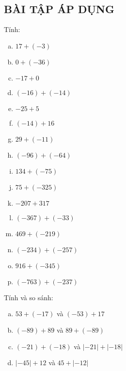\subsection{BÀI TẬP ÁP DỤNG}
\begin{bt} Tính:
\begin{multicols}{2}
\begin{enumerate} [a)]
\item $17 + (-3)$
\item $0+ (-36)$
\item $-17 +0$
\item $(-16) + (-14)$
\item $-25+5$
\item $(-14)+16$
\item $29 + (-11)$
\item $(-96) + (-64)$
\item $134+(-75)$
\item $75+(-325)$
\item $-207+317$
\item $(-367)+(-33)$
\item $469 + (-219)$
\item $(-234)+ (-257)$
\item $916+ (-345)$
\item $(-763) + (-237)$
\end{enumerate}
\end{multicols}

\end{bt}   \begin{bt}
Tính và so sánh:
\begin{enumerate}[a)]
\item $53 + (-17)$ và $(-53) + 17$
\item $(-89) + 89$ và $89 + (-89)$
\item $(-21) + (-18)$ và $|-21| + |-18|$
\item $|-45| +12$ và $45 + |-12|$
\end{enumerate}

\end{bt}
